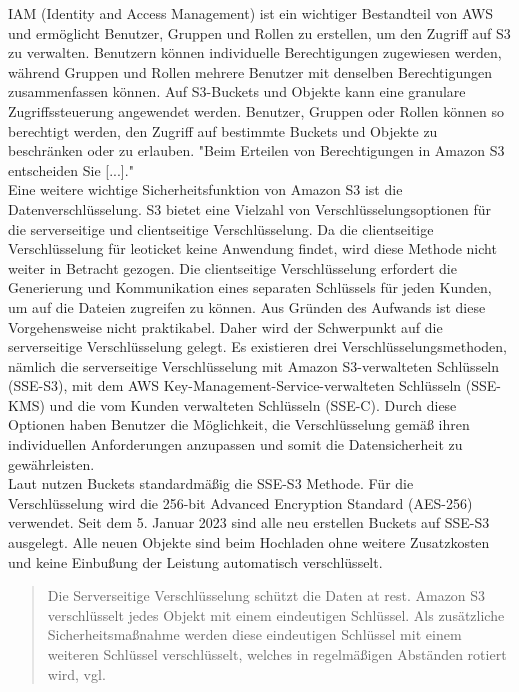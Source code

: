 IAM (Identity and Access Management) ist ein wichtiger Bestandteil von AWS und ermöglicht Benutzer, Gruppen und Rollen zu erstellen, um den Zugriff auf S3 zu verwalten. Benutzern können individuelle Berechtigungen zugewiesen werden, während Gruppen und Rollen mehrere Benutzer mit denselben Berechtigungen zusammenfassen können. Auf S3-Buckets und Objekte kann eine granulare Zugriffssteuerung angewendet werden. Benutzer, Gruppen oder Rollen können so berechtigt werden, den Zugriff auf bestimmte Buckets und Objekte zu beschränken oder zu erlauben. "Beim Erteilen von Berechtigungen in Amazon S3 entscheiden Sie [...]."\cite{aws-iam-s3}\\

Eine weitere wichtige Sicherheitsfunktion von Amazon S3 ist die Datenverschlüsselung. S3 bietet eine Vielzahl von Verschlüsselungsoptionen für die serverseitige und clientseitige Verschlüsselung. Da die clientseitige Verschlüsselung für leoticket keine Anwendung findet, wird diese Methode nicht weiter in Betracht gezogen. Die clientseitige Verschlüsselung erfordert die Generierung und Kommunikation eines separaten Schlüssels für jeden Kunden, um auf die Dateien zugreifen zu können. Aus Gründen des Aufwands ist diese Vorgehensweise nicht praktikabel. Daher wird der Schwerpunkt auf die serverseitige Verschlüsselung gelegt. Es existieren drei Verschlüsselungsmethoden, nämlich die serverseitige Verschlüsselung mit Amazon S3-verwalteten Schlüsseln (SSE-S3), mit dem AWS Key-Management-Service-verwalteten Schlüsseln (SSE-KMS) und die vom Kunden verwalteten Schlüsseln (SSE-C). Durch diese Optionen haben Benutzer die Möglichkeit, die Verschlüsselung gemäß ihren individuellen Anforderungen anzupassen und somit die Datensicherheit zu gewährleisten.\\


Laut \citeauthor{aws-iam-s3} nutzen Buckets standardmäßig die SSE-S3 Methode. Für die Verschlüsselung wird die 256-bit Advanced Encryption Standard (AES-256) verwendet. Seit dem 5. Januar 2023 sind alle neu erstellen Buckets auf SSE-S3 ausgelegt. Alle neuen Objekte sind beim Hochladen ohne weitere Zusatzkosten und keine Einbußung der Leistung automatisch verschlüsselt.

\begin{quote}
	Die Serverseitige Verschlüsselung schützt die Daten at rest. Amazon S3 verschlüsselt jedes Objekt mit einem eindeutigen Schlüssel. Als zusätzliche Sicherheitsmaßnahme werden diese eindeutigen Schlüssel mit einem weiteren Schlüssel verschlüsselt, welches in regelmäßigen Abständen rotiert wird, vgl. \cite{aws-iam-s3}
\end{quote}

